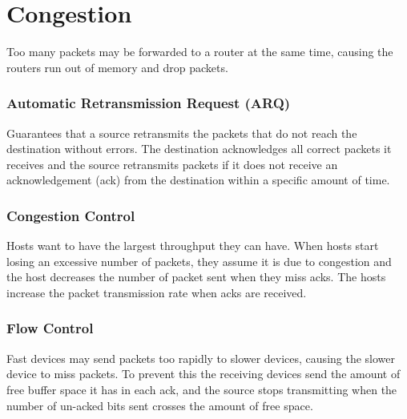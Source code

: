 \section{Congestion}
Too many packets may be forwarded to a router at the same time, causing the routers run out of memory and drop packets. 
\subsubsection*{Automatic Retransmission Request (ARQ)}
Guarantees that a source retransmits the packets that do not reach the destination without errors. The destination acknowledges all correct packets it receives and the source retransmits packets if it does not receive an acknowledgement (ack) from the destination within a specific amount of time. 
\subsubsection*{Congestion Control}
Hosts want to have the largest throughput they can have. When hosts start losing an excessive number of packets, they assume it is due to congestion and the host decreases the number of packet sent when they miss acks. The hosts increase the packet transmission rate when acks are received.
\subsubsection*{Flow Control}
Fast devices may send packets too rapidly to slower devices, causing the slower device to miss packets. To prevent this the receiving devices send the amount of free buffer space it has in each ack, and the source stops transmitting when the number of un-acked bits sent crosses the amount of free space. 